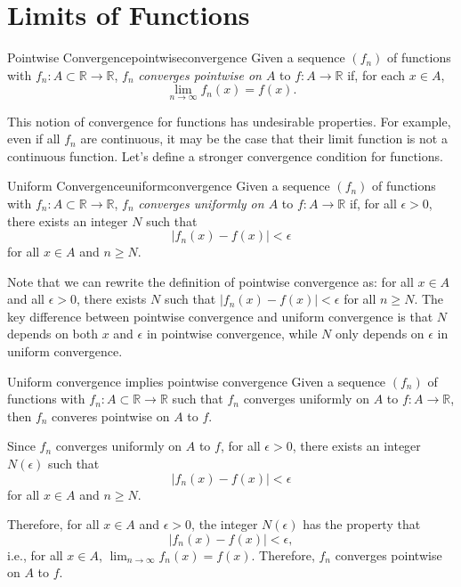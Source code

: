 \chapter{Limits of Functions}


\begin{defn}{Pointwise Convergence}{pointwiseconvergence}
  Given a sequence \((f_n)\) of functions with \(f_n \colon A \subset \mathbb{R} \to \mathbb{R}\), \(f_n\) \emph{converges pointwise on \(A\)} to \(f\colon A \to \mathbb{R}\) if, for each \(x \in A\), \[ \lim_{n\to\infty} f_n(x) = f(x).\]
\end{defn}

This notion of convergence for functions has undesirable properties. For example, even if all \(f_n\) are continuous, it may be the case that their limit function is not a continuous function. Let's define a stronger convergence condition for functions.

\begin{defn}{Uniform Convergence}{uniformconvergence}
  Given a sequence \((f_n)\) of functions with \(f_n \colon A \subset \mathbb{R} \to \mathbb{R}\), \(f_n\) \emph{converges uniformly on \(A\)} to \(f \colon A \to \mathbb{R}\) if, for all \(\epsilon > 0\), there exists an integer \(N\) such that \[ |f_n(x) - f(x) | < \epsilon \] for all \(x \in A\) and \(n \geq N\).
\end{defn}

Note that we can rewrite the definition of pointwise convergence as: for all \(x \in A\) and all \(\epsilon > 0\), there exists \(N\) such that \(|f_n(x) - f(x)| < \epsilon\) for all \(n \geq N\). The key difference between pointwise convergence and uniform convergence is that  \(N\) depends on both \(x\) and \(\epsilon\) in pointwise convergence, while  \(N\) only depends on \(\epsilon\) in uniform convergence.

\begin{prop}{Uniform convergence implies pointwise convergence}{}
  Given a sequence \((f_n)\) of functions with \(f_n \colon A \subset \mathbb{R} \to \mathbb{R}\) such that \(f_n\) converges uniformly on \(A\) to \(f\colon A \to \mathbb{R}\), then \(f_n\) converes pointwise on \(A\) to \(f\).
\end{prop}
\begin{dem}{}{}
  Since \(f_n\) converges uniformly on \(A\) to \(f\), for all \(\epsilon > 0\), there exists an integer \(N(\epsilon)\) such that \[ |f_n(x) - f(x) | < \epsilon \] for all \(x \in A\) and \(n \geq N\).

  Therefore, for all \(x \in A\) and \(\epsilon > 0\), the integer \(N(\epsilon)\) has the property that \[ | f_n(x) - f(x) | < \epsilon,\] i.e., for all \(x \in A\),  \(\lim_{n \to\infty} f_n(x) = f(x)\). Therefore, \(f_n\) converges pointwise on \(A\) to \(f\).
\end{dem}

